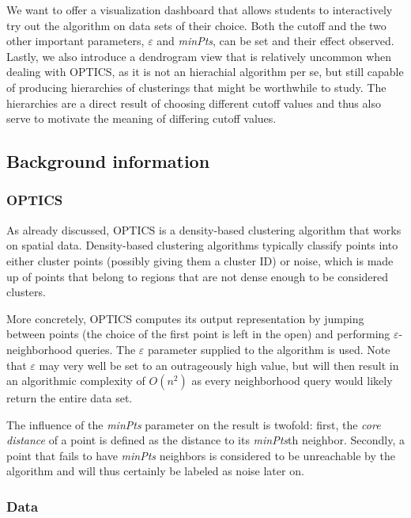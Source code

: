 \documentclass{vgtc}                          %
\begin{document}
We want to offer a visualization dashboard that allows students to
interactively try out the algorithm on data sets of their choice. Both the
cutoff and the two other important parameters, $\varepsilon$ and \emph{minPts}, can
be set and their effect observed. Lastly, we also introduce a dendrogram view
that is relatively uncommon when dealing with OPTICS, as it is not an hierachial
algorithm per se, but still capable of producing hierarchies of clusterings
that might be worthwhile to study. The hierarchies are a direct result of
choosing different cutoff values and thus also serve to motivate the meaning of
differing cutoff values.

\subsection{Background information}

\subsubsection{OPTICS}

As already discussed, OPTICS is a density-based clustering algorithm that works
on spatial data. Density-based clustering algorithms typically classify points
into either cluster points (possibly giving them a cluster ID) or noise, which
is made up of points that belong to regions that are not dense enough to be
considered clusters.

More concretely, OPTICS computes its output representation by jumping between
points (the choice of the first point is left in the open) and performing
$\varepsilon$-neighborhood queries. The $\varepsilon$ parameter supplied to the
algorithm is used. Note that $\varepsilon$ may very well be set to an
outrageously high value, but will then result in an algorithmic complexity of
$O(n^2)$ as every neighborhood query would likely return the entire data set.

The influence of the \emph{minPts} parameter on the result is twofold: first,
the \emph{core distance} of a point is defined as the distance to its
\emph{minPts}th neighbor. Secondly, a point that fails to have \emph{minPts}
neighbors is considered to be unreachable by the algorithm and will thus
certainly be labeled as noise later on.

\subsubsection{Data}
\end{document}
